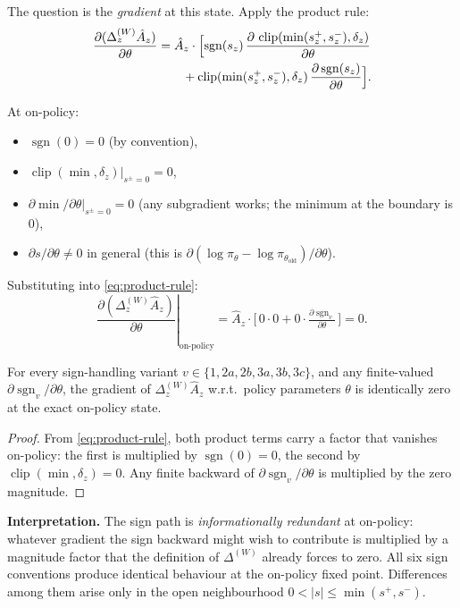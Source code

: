 \documentclass[11pt]{article}
\DeclareMathOperator*{\clip}{clip}
\DeclareMathOperator{\sign}{sgn}
\begin{document}
The question is the \emph{gradient} at this state. Apply the product rule:
\begin{align}
\frac{\partial (\Delta_z^{(W)} \hat A_z)}{\partial \theta}
 &= \hat A_z\cdot\Bigl[
 \sign(s_z)\,\frac{\partial\,\clip(\min(s_z^+,s_z^-),\delta_z)}{\partial \theta}
 \nonumber \\
 &\qquad + \clip(\min(s_z^+,s_z^-),\delta_z)\,\frac{\partial \sign(s_z)}{\partial \theta}\Bigr].
 \label{eq:product-rule}
\end{align}

At on-policy:
\begin{itemize}
\item $\sign(0) = 0$ (by convention),
\item $\clip(\min,\delta_z)\big|_{s^{\pm}=0} = 0$,
\item $\partial\min/\partial\theta\big|_{s^{\pm}=0} = 0$ (any subgradient
works; the minimum at the boundary is $0$),
\item $\partial s/\partial \theta \neq 0$ in general (this is
$\partial(\log\pi_\theta - \log\pi_{\theta_{\text{old}}})/\partial\theta$).
\end{itemize}

Substituting into \eqref{eq:product-rule}:
\[
\left.\frac{\partial (\Delta_z^{(W)} \hat A_z)}{\partial \theta}\right|_{\text{on-policy}}
= \hat A_z\cdot\bigl[\,0\cdot 0 + 0\cdot \tfrac{\partial \sign_v}{\partial\theta}\,\bigr]
= 0.
\]

\begin{theorem}
\label{thm:preannihilation}
For every sign-handling variant $v \in \{1, 2a, 2b, 3a, 3b, 3c\}$, and any
finite-valued $\partial\sign_v/\partial\theta$, the gradient of
$\Delta_z^{(W)}\hat A_z$ w.r.t.\ policy parameters $\theta$ is
identically zero at the exact on-policy state.
\end{theorem}

\begin{proof}
From \eqref{eq:product-rule}, both product terms carry a factor that
vanishes on-policy: the first is multiplied by $\sign(0)=0$, the second
by $\clip(\min,\delta_z)=0$. Any finite backward of
$\partial\sign_v/\partial\theta$ is multiplied by the zero magnitude.
\end{proof}

\textbf{Interpretation.} The sign path is \emph{informationally redundant}
at on-policy: whatever gradient the sign backward might wish to contribute
is multiplied by a magnitude factor that the definition of $\Delta^{(W)}$
already forces to zero. All six sign conventions produce identical
behaviour at the on-policy fixed point. Differences among them arise only
in the open neighbourhood $0 < |s| \leq \min(s^+, s^-)$.
\end{document}
